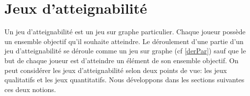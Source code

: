 
\section{Jeux d'atteignabilité}

Un jeu d'atteignabilité est un jeu sur graphe particulier. Chaque joueur possède un ensemble objectif qu'il souhaite atteindre. Le déroulement d'une partie d'un jeu d'atteignabilité se déroule comme un jeu sur graphe (cf \ref{derPar}) sauf que le but de chaque joueur est d'atteindre un élément de son ensemble objectif. On peut considérer les jeux d'atteignabilité selon deux points de vue: les jeux qualitatifs et les jeux quantitatifs. Nous développons dans les sections suivantes ces deux notions.





